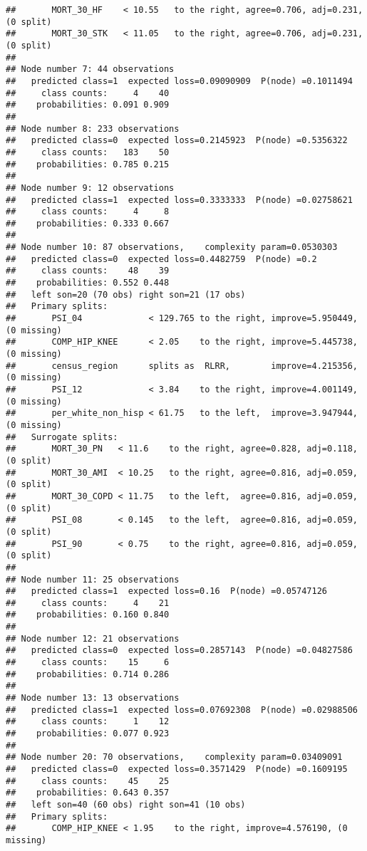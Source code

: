 \documentclass[
]{article}
\begin{document}
\begin{verbatim}
##       MORT_30_HF    < 10.55   to the right, agree=0.706, adj=0.231, (0 split)
##       MORT_30_STK   < 11.05   to the right, agree=0.706, adj=0.231, (0 split)
## 
## Node number 7: 44 observations
##   predicted class=1  expected loss=0.09090909  P(node) =0.1011494
##     class counts:     4    40
##    probabilities: 0.091 0.909 
## 
## Node number 8: 233 observations
##   predicted class=0  expected loss=0.2145923  P(node) =0.5356322
##     class counts:   183    50
##    probabilities: 0.785 0.215 
## 
## Node number 9: 12 observations
##   predicted class=1  expected loss=0.3333333  P(node) =0.02758621
##     class counts:     4     8
##    probabilities: 0.333 0.667 
## 
## Node number 10: 87 observations,    complexity param=0.0530303
##   predicted class=0  expected loss=0.4482759  P(node) =0.2
##     class counts:    48    39
##    probabilities: 0.552 0.448 
##   left son=20 (70 obs) right son=21 (17 obs)
##   Primary splits:
##       PSI_04             < 129.765 to the right, improve=5.950449, (0 missing)
##       COMP_HIP_KNEE      < 2.05    to the right, improve=5.445738, (0 missing)
##       census_region      splits as  RLRR,        improve=4.215356, (0 missing)
##       PSI_12             < 3.84    to the right, improve=4.001149, (0 missing)
##       per_white_non_hisp < 61.75   to the left,  improve=3.947944, (0 missing)
##   Surrogate splits:
##       MORT_30_PN   < 11.6    to the right, agree=0.828, adj=0.118, (0 split)
##       MORT_30_AMI  < 10.25   to the right, agree=0.816, adj=0.059, (0 split)
##       MORT_30_COPD < 11.75   to the left,  agree=0.816, adj=0.059, (0 split)
##       PSI_08       < 0.145   to the left,  agree=0.816, adj=0.059, (0 split)
##       PSI_90       < 0.75    to the right, agree=0.816, adj=0.059, (0 split)
## 
## Node number 11: 25 observations
##   predicted class=1  expected loss=0.16  P(node) =0.05747126
##     class counts:     4    21
##    probabilities: 0.160 0.840 
## 
## Node number 12: 21 observations
##   predicted class=0  expected loss=0.2857143  P(node) =0.04827586
##     class counts:    15     6
##    probabilities: 0.714 0.286 
## 
## Node number 13: 13 observations
##   predicted class=1  expected loss=0.07692308  P(node) =0.02988506
##     class counts:     1    12
##    probabilities: 0.077 0.923 
## 
## Node number 20: 70 observations,    complexity param=0.03409091
##   predicted class=0  expected loss=0.3571429  P(node) =0.1609195
##     class counts:    45    25
##    probabilities: 0.643 0.357 
##   left son=40 (60 obs) right son=41 (10 obs)
##   Primary splits:
##       COMP_HIP_KNEE < 1.95    to the right, improve=4.576190, (0 missing)

\end{verbatim}
\end{document}
